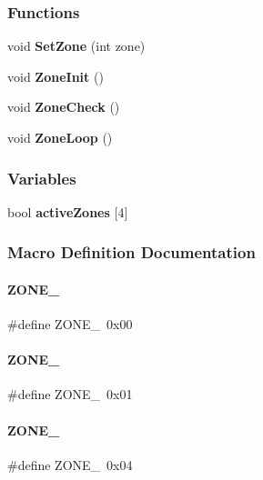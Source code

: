 \subsubsection*{Functions}
\begin{DoxyCompactItemize}
\item 
void \textbf{ Set\+Zone} (int zone)
\item 
void \textbf{ Zone\+Init} ()
\item 
void \textbf{ Zone\+Check} ()
\item 
void \textbf{ Zone\+Loop} ()
\end{DoxyCompactItemize}
\subsubsection*{Variables}
\begin{DoxyCompactItemize}
\item 
bool \textbf{ active\+Zones} [4]
\end{DoxyCompactItemize}


\subsubsection{Macro Definition Documentation}
\mbox{\label{a00062_af28a3304f4df7dd917c364b4d67ba953}} 
\paragraph{Z\+O\+N\+E\+\_}
{\footnotesize\ttfamily \#define Z\+O\+N\+E\+\_~0x00}

\mbox{\label{a00062_a6a43a6aa1c8267839f08da835b8f5aec}} 
\paragraph{Z\+O\+N\+E\+\_}
{\footnotesize\ttfamily \#define Z\+O\+N\+E\+\_~0x01}

\mbox{\label{a00062_a3f02a72dbcb6379f3b79f4c4e981f285}} 
\paragraph{Z\+O\+N\+E\+\_}
{\footnotesize\ttfamily \#define Z\+O\+N\+E\+\_~0x04}

